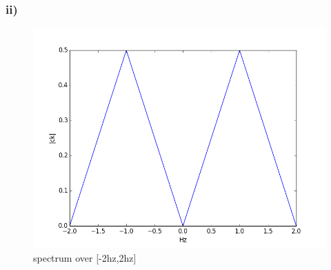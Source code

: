 \subsubsection*{ii)}
\begin{figure}[H]
  \includegraphics[width=\textwidth]{2dii}
  \caption{spectrum over [-2hz,2hz]}
  \label{fig:2dii}
\end{figure}


